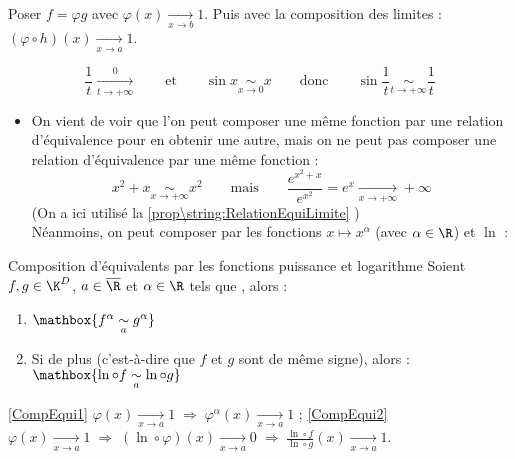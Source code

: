 \documentclass[12pt,a4paper]{report}
\begin{document}
\begin{demo}
    Poser $f = \varphi g$ avec $\varphi(x) \xrightarrow[x \to b]{} 1$. Puis avec la composition des limites : $(\varphi \circ h)(x) \xrightarrow[x \to a]{} 1$.
\end{demo}

\begin{exemple}
    $$ \frac{1}{t} \xrightarrow[t \to +\infty]{0} \qquad \text{et} \qquad \sin x \underset{x \to 0}{\sim} x \qquad \text{donc} \qquad \sin \frac{1}{t} \underset{t \to +\infty}{\sim} \dfrac{1}{t} $$
\end{exemple}

\begin{remarque}
\begin{itemize}
    \item[\danger] On vient de voir que l'on peut composer une même fonction par une relation d'équivalence pour en obtenir une autre, mais on ne peut pas composer une relation d'équivalence par une même fonction :
    $$ x^2 + x \underset{x \to +\infty}{\sim} x^2 \qquad \text{mais} \qquad \dfrac{e^{x^2 + x}}{e^{x^2}} = e^x \xrightarrow[x \to +\infty]{} +\infty $$
    (On a ici utilisé la \cref{prop\string:RelationEquiLimite} )\\
    Néanmoins, on peut composer par les fonctions $x \mapsto x^\alpha$ (avec $\alpha \in \R$) et $\ln$ : 
\end{itemize}
\end{remarque}

\begin{propositions}{Composition d'équivalents par les fonctions puissance et logarithme}{}
    Soient $f, g \in \K^D$, $a \in \overline{\R}$ et $\alpha \in \R$ tels que , alors :
    \begin{enumerate}
        \item\label{CompEqui1} $\mathbox{f^\alpha \underset{a}{\sim} g^\alpha}$
        \item\label{CompEqui2} Si de plus  (c'est-à-dire que $f$ et $g$ sont de même signe), alors : $\mathbox{\ln \circ f \underset{a}{\sim} \ln \circ g}$
    \end{enumerate}
\end{propositions}

\begin{demo}
    \ref{CompEqui1} $\varphi(x) \xrightarrow[x \to a]{} 1 \; \Longrightarrow \; \varphi^\alpha(x) \xrightarrow[x \to a]{} 1$ ; \hfill \ref{CompEqui2} $\varphi(x) \xrightarrow[x \to a]{} 1 \; \Longrightarrow \; (\ln \circ \varphi)(x) \xrightarrow[x \to a]{} 0 \; \Longrightarrow \; \frac{\ln \circ f}{\ln \circ g}(x) \xrightarrow[x \to a]{} 1$.
\end{demo}
\end{document}
